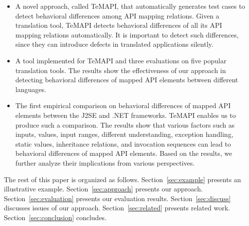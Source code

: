 \begin{itemize}\vspace*{-1.5ex}
\item A novel approach, called TeMAPI, that automatically generates test cases to detect behavioral differences among API mapping relations. Given a translation tool, TeMAPI detects behavioral differences of all its API mapping relations automatically. It is important to detect such differences, since they can introduce defects in translated applications silently.\vspace*{-1.5ex}
\item A tool implemented for TeMAPI and three evaluations on five popular translation tools. The results show the effectiveness of our approach in detecting behavioral differences of mapped API elements between different languages.
\vspace*{-1.5ex}
\item The first empirical comparison on behavioral differences of mapped API elements between the J2SE and .NET frameworks. TeMAPI enables us to produce such a comparison. The results show that various factors such as  inputs,  values, input ranges, different understanding, exception handling, static values, inheritance relations, and invocation sequences can lead to behavioral differences of mapped API elements. Based on the results, we further analyze their implications from various perspectives.
\end{itemize}\vspace*{-1.5ex}

The rest of this paper is organized as follows.
Section~\ref{sec:example} presents an illustrative example.
Section~\ref{sec:approach} presents our approach.
Section~\ref{sec:evaluation} presents our evaluation results.
Section~\ref{sec:discuss} discusses issues of our approach.
Section~\ref{sec:related} presents related work.
Section~\ref{sec:conclusion} concludes.


